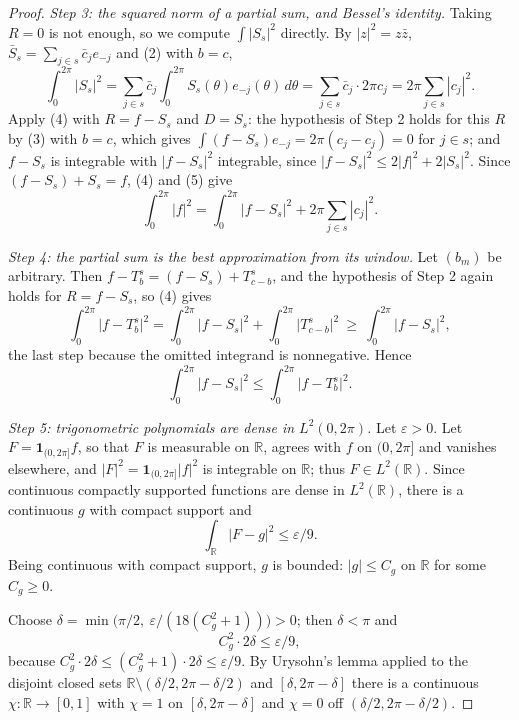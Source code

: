 \begin{proof}
\emph{Step 3: the squared norm of a partial sum, and Bessel's identity.}
Taking $R=0$ is not enough, so we compute $\int|S_s|^2$ directly.  By
$|z|^2=z\bar z$, $\bar S_s=\sum_{j\in s}\bar c_je_{-j}$ and (2) with $b=c$,
\begin{equation}\tag{5}
  \int_0^{2\pi}|S_s|^2
  =\sum_{j\in s}\bar c_j\int_0^{2\pi}S_s(\theta)e_{-j}(\theta)\,d\theta
  =\sum_{j\in s}\bar c_j\cdot2\pi c_j=2\pi\sum_{j\in s}|c_j|^2 .
\end{equation}
Apply (4) with $R=f-S_s$ and $D=S_s$: the hypothesis of Step 2 holds for this
$R$ by (3) with $b=c$, which gives $\int(f-S_s)e_{-j}=2\pi(c_j-c_j)=0$ for
$j\in s$; and $f-S_s$ is integrable with $|f-S_s|^2$ integrable, since
$|f-S_s|^2\le2|f|^2+2|S_s|^2$.  Since $(f-S_s)+S_s=f$, (4) and (5) give
\begin{equation}\tag{6}
  \int_0^{2\pi}|f|^2=\int_0^{2\pi}\bigl|f-S_s\bigr|^2+2\pi\sum_{j\in s}|c_j|^2 .
\end{equation}

\emph{Step 4: the partial sum is the best approximation from its window.}  Let
$(b_m)$ be arbitrary.  Then
$f-T_b^s=(f-S_s)+T_{c-b}^s$, and the hypothesis of Step 2 again holds for
$R=f-S_s$, so (4) gives
\[
  \int_0^{2\pi}\bigl|f-T_b^s\bigr|^2
  =\int_0^{2\pi}\bigl|f-S_s\bigr|^2+\int_0^{2\pi}\bigl|T_{c-b}^s\bigr|^2
  \ \ge\ \int_0^{2\pi}\bigl|f-S_s\bigr|^2 ,
\]
the last step because the omitted integrand is nonnegative.  Hence
\begin{equation}\tag{7}
  \int_0^{2\pi}\bigl|f-S_s\bigr|^2\le\int_0^{2\pi}\bigl|f-T_b^s\bigr|^2 .
\end{equation}

\emph{Step 5: trigonometric polynomials are dense in $L^2(0,2\pi)$.}  Let
$\varepsilon>0$.  Let $F=\mathbf1_{(0,2\pi]}f$, so that $F$ is measurable on
$\mathbb{R}$, agrees with $f$ on $(0,2\pi]$ and vanishes elsewhere, and
$|F|^2=\mathbf1_{(0,2\pi]}|f|^2$ is integrable on $\mathbb{R}$; thus
$F\in L^2(\mathbb{R})$.  Since continuous compactly supported functions are
dense in $L^2(\mathbb{R})$, there is a continuous $g$ with compact support and
\begin{equation}\tag{8}
  \int_{\mathbb{R}}|F-g|^2\le\varepsilon/9 .
\end{equation}
Being continuous with compact support, $g$ is bounded: $|g|\le C_g$ on
$\mathbb{R}$ for some $C_g\ge0$.

Choose $\delta=\min\bigl(\pi/2,\ \varepsilon/(18(C_g^2+1))\bigr)>0$; then
$\delta<\pi$ and
\begin{equation}\tag{9}
  C_g^2\cdot2\delta\le\varepsilon/9 ,
\end{equation}
because $C_g^2\cdot2\delta\le(C_g^2+1)\cdot2\delta\le\varepsilon/9$.  By
Urysohn's lemma applied to the disjoint closed sets
$\mathbb{R}\setminus(\delta/2,2\pi-\delta/2)$ and $[\delta,2\pi-\delta]$ there
is a continuous $\chi\colon\mathbb{R}\to[0,1]$ with $\chi=1$ on
$[\delta,2\pi-\delta]$ and $\chi=0$ off $(\delta/2,2\pi-\delta/2)$.


\end{proof}
